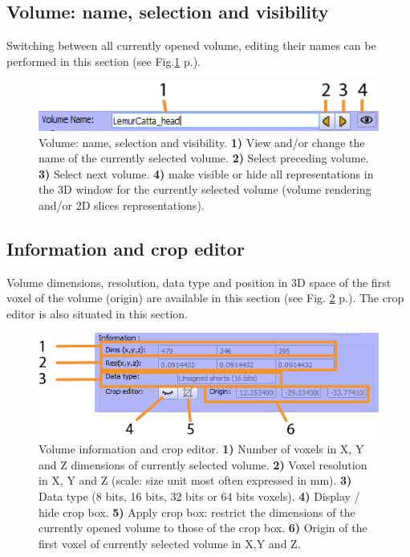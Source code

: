 \subsection{Volume: name, selection and visibility}
Switching between all currently opened volume, editing their names can be performed in this section (see Fig.\ref{volume_name} p.\pageref{volume_name}).
\begin{figure}
  \centering
  \includegraphics[scale=1]{images/14/volume_name2.png}
\caption{Volume: name, selection and visibility. \textbf{1)} View and/or change the name of the currently selected volume.  \textbf{2)} Select preceding volume.  \textbf{3)} Select next volume. \textbf{4)} make visible or hide all representations in the 3D window for the currently selected volume (volume rendering and/or 2D slices representations). }	
\label{volume_name}
 \end{figure}

\subsection{Information and crop editor}
Volume dimensions, resolution, data type and position in 3D space of the first voxel of the volume (origin) are available in this section (see Fig. \ref{volume_information} p.\pageref{volume_information}). The crop editor is also situated in this section. 
\begin{figure}
  \centering
  \includegraphics[scale=1]{images/14/volume_information2.png}
\caption{Volume information and crop editor. \textbf{1)} Number of voxels in X, Y and Z dimensions of currently selected volume.   \textbf{2)} Voxel resolution in X, Y and Z (scale: size unit most often expressed in mm). \textbf{3)} Data type (8 bits, 16 bits, 32 bits or 64 bits voxels).  \textbf{4)} Display / hide crop box. \textbf{5)} Apply crop box: restrict the dimensions of the currently opened volume to those of the crop box. \textbf{6)} Origin of the first voxel of currently selected volume in X,Y and Z. }	
\label{volume_information}
 \end{figure}


